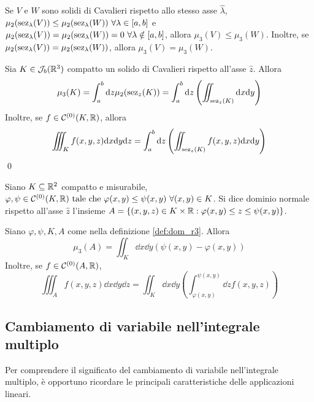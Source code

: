 \begin{axiom}
    [di Cavalieri]
    Se $V$ e $W$ sono solidi di Cavalieri rispetto allo stesso asse $\hat{\lambda}$, $\mu_2(\sez_\lambda(V))\leq\mu_2(\sez_\lambda(W)) \ \forall \lambda \in [a,b]$ e $\mu_2(\sez_\lambda(V))=\mu_2(\sez_\lambda(W))=0 \ \forall \lambda \notin [a,b]$, allora $\mu_3(V)\leq \mu_3(W)$. Inoltre, se $\mu_2(\operatorname{sez}_\lambda(V))=\mu_2(\operatorname{sez}_\lambda(W))$, allora $\mu_3(V)=\mu_3(W)$.
\end{axiom}

\begin{theorem}
    [di Cavalieri]
    Sia $K \in \mathcal{J}_b(\mathbb{R}^3)$ compatto un solido di Cavalieri rispetto all'asse $\hat{z}$. Allora
    $$
        \mu_3(K)=\int_a^b\dd z\mu_2(\operatorname{sez}_z(K))=\int_a^b\dd z\left(\iint_{\operatorname{sez}_z(K)}\dd x\dd y\right)    
    $$
    Inoltre, se $f \in \mathcal{C}^{(0)}(K,\mathbb{R})$, allora
    $$
        \iiint_Kf(x,y,z)\dd x\dd y\dd z=\int_a^b\dd z\left(\iint_{\operatorname{sez}_z(K)}f(x,y,z)\dd x\dd y\right)
    $$
    \qed
\end{theorem}

\begin{definition}
    \label{def:dom_r3}
    Siano $K\subseteq \mathbb{R}^2$ compatto e misurabile, $\varphi,\psi \in \mathcal{C}^{(0)}(K,\mathbb{R}) \text{ tale che } \varphi(x,y)\leq \psi(x,y) \ \forall (x,y) \in K$. Si dice dominio normale rispetto all'asse $\hat{z}$ l'insieme $A=\{(x,y,z)\in K \times \mathbb{R} : \varphi(x,y)\leq z \leq \psi(x,y)\}$.
\end{definition}

\begin{theorem}
    Siano $\varphi, \psi, K, A$ come nella definizione \ref{def:dom_r3}. Allora
    $$
        \mu_3(A)=\iint_K\dd x\dd y(\psi(x,y)-\varphi(x,y))
    $$
    Inoltre, se $f \in \mathcal{C}^{(0)}(A,\mathbb{R})$,
    $$
        \iiint_Af(x,y,z)\dd x\dd y\dd z = \iint_K\dd x\dd y\left(\int_{\varphi(x,y)}^{\psi(x,y)}\dd zf(x,y,z)\right)
    $$
\end{theorem}

\subsection{Cambiamento di variabile nell'integrale multiplo}

Per comprendere il significato del cambiamento di variabile nell'integrale multiplo, è opportuno ricordare le principali caratteristiche delle applicazioni lineari.

